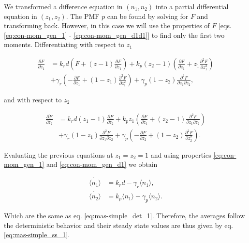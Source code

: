We transformed a difference equation in $(n_1,n_2)$ into a partial differential equation in $(z_1,z_2)$. The PMF $p$ can be found by solving for $F$ and transforming back. However, in this case we will use the properties of $F$ [eqs. \eqref{eq:con-mom_gen_1} - \eqref{eq:con-mom_gen_d1d1}] to find only the first two moments. Differentiating with respect to $z_1$

\begin{equation}
  \label{eq:dz1}
  \begin{split}
    \frac{\partial \dot{F}}{\partial z_1} &= k_rd\left( F+(z-1)\frac{\partial F}{\partial z_1} \right) + k_p(z_2-1) \left( \frac{\partial F}{\partial z_1} + z_1 \frac{\partial^2 F}{\partial z_1^2} \right)\\
    &+\gamma_r\left(-\frac{\partial F}{\partial z_1}+(1-z_1)\frac{\partial^2 F}{\partial z_1^2}\right)+\gamma_p(1-z_2)\frac{\partial^2 F}{\partial z_1 \partial z_2},
  \end{split}
\end{equation}

and with respect to $z_2$

\begin{equation}
  \label{eq:dz2}
  \begin{split}
    \frac{\partial \dot{F}}{\partial z_2}&=k_rd(z_1-1)\frac{\partial F}{\partial z_2} + k_pz_1\left(\frac{\partial F}{\partial z_1} + (z_2-1)\frac{\partial^2 F}{\partial z_1 \partial z_2} \right)\\
    &+ \gamma_r(1-z_1)\frac{\partial^2 F}{\partial z_1 \partial z_2} + \gamma_p\left(-\frac{\partial F}{\partial z_2}+(1-z_2)\frac{\partial^2 F}{\partial z_2^2}\right).
  \end{split}
\end{equation}

Evaluating the previous equations at $z_1 = z_2 = 1$ and using properties \eqref{eq:con-mom_gen_1} and \eqref{eq:con-mom_gen_d1} we obtain

\begin{align*}
\dot{\langle n_1 \rangle}&= k_rd - \gamma_r \langle n_1 \rangle,\\
\dot{\langle n_2 \rangle}&= k_p\langle n_1 \rangle - \gamma_p \langle n_2 \rangle.
\end{align*}

Which are the same as eq. \eqref{eq:mas-simple_det_1}. Therefore, the averages follow the deterministic behavior and their steady state values are thus given by eq. \eqref{eq:mas-simple_ss_1}.


